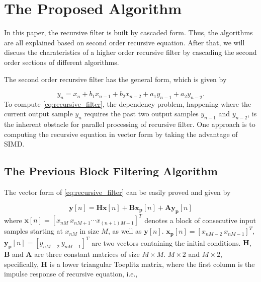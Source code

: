 \section{The Proposed Algorithm}
\label{sec:algorithm}

In this paper, the recursive filter is built by cascaded form.
Thus, the algorithms are all explained based on second order recursive equation.
After that, we will discuss the charateristics of a higher order recursive filter
by cascading the second order sections of different algorithms.

The second order recursive filter has the general form, which is given by

\begin{equation}
    \label{eq:recursive_filter}
    y_n = x_n + b_1x_{n-1} + b_2x_{n-2} + a_1y_{n-1} + a_2y_{n-2}.
\end{equation}
To compute \eqref{eq:recursive_filter}, the dependency problem, happening where the current output sample $y_n$
requires the past two output samples $y_{n-1}$ and $y_{n-2}$, is the inherent obstacle for parallel processing of recursive filter.
One approach is to computing the recursive equation in vector form by taking the advantage of SIMD. 


\subsection{The Previous Block Filtering Algorithm}

The vector form of \eqref{eq:recursive_filter} can be easily proved and given by

\begin{equation}
    \label{eq:block_filtering}
    \bm{y}[n] = \bm{H}\bm{x}[n] + \bm{B}\bm{x_p}[n] + \bm{A}\bm{y_p}[n] 
\end{equation}
where $\bm{x}[n] = \left[x_{nM}~x_{nM+1} \cdots x_{(n+1)M-1}\right]^T$ denotes a block of
consecutive input samples starting at $x_{nM}$ in size $M$, as well as $\bm{y}[n]$. 
$\bm{x_p}[n]=\left[x_{nM-2}~x_{nM-1}\right]^T$, $\bm{y_p}[n]=\left[y_{nM-2}~y_{nM-1}\right]^T$ are two vectors 
containing the initial conditions. 
$\bm{H}$, $\bm{B}$ and $\bm{A}$ are three constant matrices of size $M {\times} M$.
$M {\times} 2$ and $M {\times} 2$, 
specifically, $\bm{H}$ is a lower triangular Toeplitz matrix, where the first
column is the impulse response of recursive equation, i.e.,

